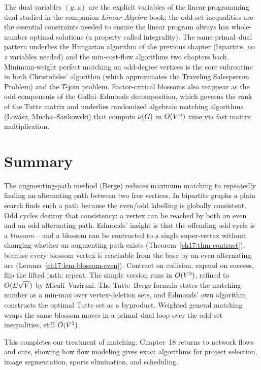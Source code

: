 \begin{connectionbox}
The dual variables $(y,z)$ are the explicit variables of the linear-programming dual studied in the
companion \emph{Linear Algebra} book; the odd-set inequalities are the essential constraints needed to ensure the linear program always has whole-number optimal solutions (a property called integrality). The same
primal--dual pattern underlies the Hungarian algorithm of the previous chapter (bipartite, no $z$
variables needed) and the min-cost-flow algorithms two chapters back. Minimum-weight perfect matching on odd-degree vertices is the core subroutine in both Christofides' algorithm (which approximates the Traveling Salesperson Problem) and the $T$-join problem. Factor-critical blossoms also reappear as the odd components of the
Gallai--Edmonds decomposition, which governs the rank of the Tutte matrix and underlies randomized
algebraic matching algorithms (Lov\'asz, Mucha--Sankowski) that compute $\nu(G)$ in
$O(V^{\omega})$ time via fast matrix multiplication.
\end{connectionbox}

\section{Summary}

The augmenting-path method (Berge) reduces maximum matching to repeatedly finding an alternating path
between two free vertices. In bipartite graphs a plain search finds such a path because the even/odd
labelling is globally consistent. Odd cycles destroy that consistency: a vertex can be reached by both
an even and an odd alternating path. Edmonds' insight is that the offending odd cycle is a
\emph{blossom} -- and a blossom can be contracted to a single super-vertex without changing whether an
augmenting path exists (Theorem~\ref{ch17:thm-contract}), because every blossom vertex is reachable
from the base by an even alternating arc (Lemma~\ref{ch17:lem-blossom-even}). Contract on collision,
expand on success, flip the lifted path; repeat. The simple version runs in $O(V^3)$, refined to
$O(E\sqrt V)$ by Micali--Vazirani. The Tutte--Berge formula states the matching number as a min-max
over vertex-deletion sets, and Edmonds' own algorithm constructs the optimal Tutte set as a byproduct.
Weighted general matching wraps the same blossom moves in a primal--dual loop over the odd-set
inequalities, still $O(V^3)$.

This completes our treatment of matching. Chapter~18 returns to network flows and cuts, showing how flow modeling gives exact algorithms for project selection, image segmentation, sports elimination, and scheduling.

